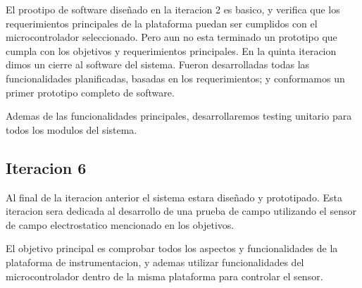 El prootipo de software diseñado en la iteracion 2 es basico, y verifica que los requerimientos principales de la plataforma puedan ser cumplidos con el microcontrolador seleccionado. Pero aun no esta terminado un prototipo que cumpla con los objetivos y requerimientos principales. En la quinta iteracion dimos un cierre al software del sistema. Fueron desarrolladas todas las funcionalidades planificadas, basadas en los requerimientos; y conformamos un primer prototipo completo de software.

Ademas de las funcionalidades principales, desarrollaremos testing unitario para todos los modulos del sistema.


\subsection{Iteracion 6} %
\label{sub:iteracion_6}

Al final de la iteracion anterior el sistema estara diseñado y prototipado. Esta iteracion sera dedicada al desarrollo de una prueba de campo utilizando el sensor de campo electrostatico mencionado en los objetivos. 

El objetivo principal es comprobar todos los aspectos y funcionalidades de la plataforma de instrumentacion, y ademas utilizar funcionalidades del microcontrolador dentro de la misma plataforma para controlar el sensor.


